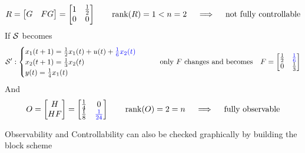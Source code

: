 \begin{exa}[SISO system of order $n=2$]
    \[
        R = \begin{bmatrix}
            G & FG
        \end{bmatrix} = \begin{bmatrix}
            1 & \frac{1}{2} \\
            0 & 0
        \end{bmatrix}
        \qquad
        \operatorname*{rank} (R) = 1 < n = 2
        \quad\implies\quad \text{not fully controllable}
    \]
    If $\mathcal{S}$ becomes 
    \begin{align*}
    \mathcal{S'}: 
        \begin{cases}
            x_1(t+1) = \frac{1}{2} x_1(t) + u(t) + \color{blue}\frac{1}{6} x_2(t)\\
            x_2(t+1) = \frac{1}{3}x_2(t) \\
            y(t) = \frac{1}{4}x_1(t)
        \end{cases}
        \qquad
        \text{only $F$ changes and becomes}\quad
        F = \begin{bmatrix}
            \frac{1}{2} & \color{blue}\frac{1}{6} \\
            0 & \frac{1}{3}
        \end{bmatrix}
    \end{align*} 
    And     
    \[
        O = \begin{bmatrix}
            H \\
            HF
        \end{bmatrix} = \begin{bmatrix}
            \frac{1}{4} & 0 \\
            \frac{1}{8} & \color{blue}\frac{1}{24}
        \end{bmatrix}
        \qquad
        \operatorname*{rank} (O) = 2 = n         \quad\implies\quad \text{fully observable}
    \]
    
    Observability and Controllability can also be checked graphically by building the block scheme 
    
      \begin{figure}[H]
        \centering
\end{figure}
\end{exa}
